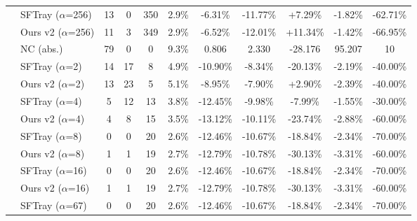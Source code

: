 \begin{table}[t]
{\begin{tabular}{ll|cccc|ccc|cc}
 & SFTray ($\alpha$=256) & 13 & 0 & 350 & 2.9\% & -6.31\% & -11.77\% & +7.29\% & -1.82\% & -62.71\% \\

 & Ours v2 ($\alpha$=256) & 11 & 3 & 349 & 2.9\% & -6.52\% & -12.01\% & +11.34\% & -1.42\% & -66.95\% \\

\addlinespace[0.3em]

\midrule

\multirow{25}{*}{uart} & NC (abs.) & 79 & 0 & 0 & 9.3\% & 0.806 & 2.330 & -28.176 & 95.207 & 10 \\

\addlinespace[0.4em]

 & SFTray ($\alpha$=2) & 14 & 17 & 8 & 4.9\% & -10.90\% & -8.34\% & -20.13\% & -2.19\% & -40.00\% \\

 & Ours v2 ($\alpha$=2) & 13 & 23 & 5 & 5.1\% & -8.95\% & -7.90\% & +2.90\% & -2.39\% & -40.00\% \\

\addlinespace[0.3em]

 & SFTray ($\alpha$=4) & 5 & 12 & 13 & 3.8\% & -12.45\% & -9.98\% & -7.99\% & -1.55\% & -30.00\% \\

 & Ours v2 ($\alpha$=4) & 4 & 8 & 15 & 3.5\% & -13.12\% & -10.11\% & -23.74\% & -2.88\% & -60.00\% \\

\addlinespace[0.3em]

 & SFTray ($\alpha$=8) & 0 & 0 & 20 & 2.6\% & -12.46\% & -10.67\% & -18.84\% & -2.34\% & -70.00\% \\

 & Ours v2 ($\alpha$=8) & 1 & 1 & 19 & 2.7\% & -12.79\% & -10.78\% & -30.13\% & -3.31\% & -60.00\% \\

\addlinespace[0.3em]

 & SFTray ($\alpha$=16) & 0 & 0 & 20 & 2.6\% & -12.46\% & -10.67\% & -18.84\% & -2.34\% & -70.00\% \\

 & Ours v2 ($\alpha$=16) & 1 & 1 & 19 & 2.7\% & -12.79\% & -10.78\% & -30.13\% & -3.31\% & -60.00\% \\

\addlinespace[0.3em]

 & SFTray ($\alpha$=67) & 0 & 0 & 20 & 2.6\% & -12.46\% & -10.67\% & -18.84\% & -2.34\% & -70.00\% \\


\end{tabular}}
\end{table}
